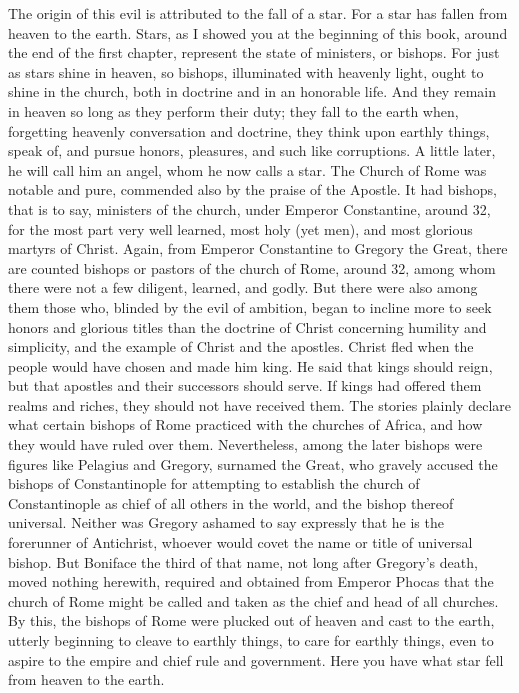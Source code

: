 The origin of this evil is attributed to the fall of a star. For a star has fallen from heaven to the earth. Stars, as I showed you at the beginning of this book, around the end of the first chapter, represent the state of ministers, or bishops. For just as stars shine in heaven, so bishops, illuminated with heavenly light, ought to shine in the church, both in doctrine and in an honorable life. And they remain in heaven so long as they perform their duty; they fall to the earth when, forgetting heavenly conversation and doctrine, they think upon earthly things, speak of, and pursue honors, pleasures, and such like corruptions. A little later, he will call him an angel, whom he now calls a star. The Church of Rome was notable and pure, commended also by the praise of the Apostle. It had bishops, that is to say, ministers of the church, under Emperor Constantine, around 32, for the most part very well learned, most holy (yet men), and most glorious martyrs of Christ. Again, from Emperor Constantine to Gregory the Great, there are counted bishops or pastors of the church of Rome, around 32, among whom there were not a few diligent, learned, and godly. But there were also among them those who, blinded by the evil of ambition, began to incline more to seek honors and glorious titles than the doctrine of Christ concerning humility and simplicity, and the example of Christ and the apostles. Christ fled when the people would have chosen and made him king. He said that kings should reign, but that apostles and their successors should serve. If kings had offered them realms and riches, they should not have received them. The stories plainly declare what certain bishops of Rome practiced with the churches of Africa, and how they would have ruled over them. Nevertheless, among the later bishops were figures like Pelagius and Gregory, surnamed the Great, who gravely accused the bishops of Constantinople for attempting to establish the church of Constantinople as chief of all others in the world, and the bishop thereof universal. Neither was Gregory ashamed to say expressly that he is the forerunner of Antichrist, whoever would covet the name or title of universal bishop. But Boniface the third of that name, not long after Gregory’s death, moved nothing herewith, required and obtained from Emperor Phocas that the church of Rome might be called and taken as the chief and head of all churches. By this, the bishops of Rome were plucked out of heaven and cast to the earth, utterly beginning to cleave to earthly things, to care for earthly things, even to aspire to the empire and chief rule and government. Here you have what star fell from heaven to the earth.

